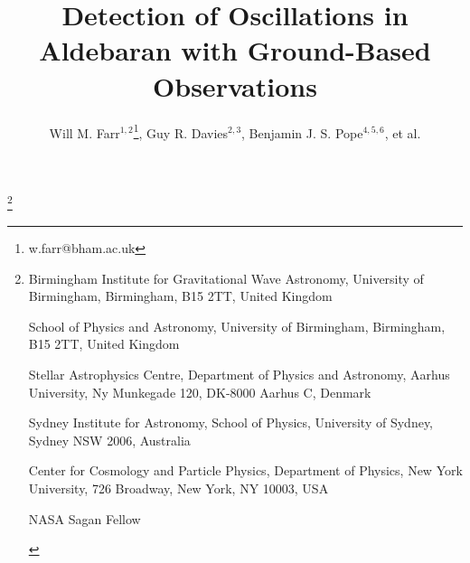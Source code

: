 \documentclass{natureprintstyle}
\title{Detection of Oscillations in Aldebaran with Ground-Based Observations}
\author{Will M. Farr$^{1,2}$\thanks{w.farr@bham.ac.uk}, Guy R. Davies$^{2,3}$, Benjamin J. S. Pope$^{4,5,6}$, et al.}
\begin{document}
\maketitle

\let\thefootnote\relax\footnote{
\begin{affiliations}
\item {Birmingham Institute for Gravitational Wave Astronomy,
  University of Birmingham, Birmingham, B15 2TT, United Kingdom}
\item {School of Physics and Astronomy, University of
  Birmingham, Birmingham, B15 2TT, United Kingdom}
\item {Stellar Astrophysics Centre, Department of Physics 
and Astronomy, Aarhus University, Ny Munkegade 120, DK-8000 Aarhus C, Denmark}
\item {Sydney Institute for Astronomy, School of Physics, University of Sydney, Sydney NSW 2006, Australia} 
\item {Center for Cosmology and Particle Physics, Department of Physics, New York University, 726 Broadway, New York, NY 10003, USA}
\item {NASA Sagan Fellow}

\end{affiliations}
}
\end{document}
